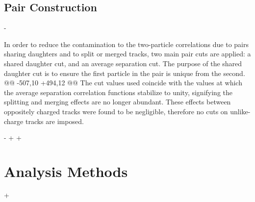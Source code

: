  \subsection{Pair Construction}
 \label{PairConstruction}
-
 
 In order to reduce the contamination to the two-particle correlations due to pairs sharing daughters and to split or merged tracks, two main pair cuts are applied: a shared daughter cut, and an average separation cut.
 The purpose of the shared daughter cut is to ensure the first particle in the pair is unique from the second.  
@@ -507,10 +494,12 @@
 The cut values used coincide with the values at which the average separation correlation functions stabilize to unity, signifying the splitting and merging effects are no longer abundant.
 These effects between oppositely charged tracks were found to be negligible, therefore no cuts on unlike-charge tracks are imposed.
 
-
+%
+%
 \section{Analysis Methods}
 \label{sec:AnalysisMethods}
 
+%
